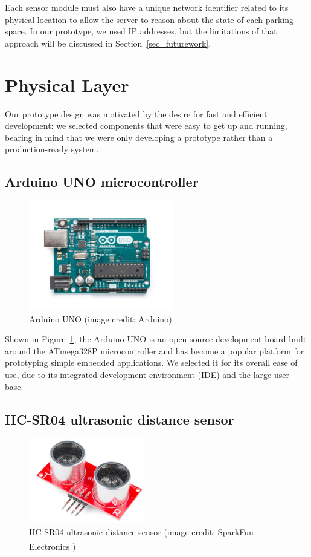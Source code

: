 \documentclass[conference]{IEEEtran}
\begin{document}
Each sensor module must also have a unique network identifier related to its physical location to allow the server to reason about the state of each parking space. In our prototype, we used IP addresses, but the limitations of that approach will be discussed in Section~\ref{sec_futurework}.

\section{Physical Layer}\label{sec_phys}
Our prototype design was motivated by the desire for fast and efficient development: we selected components that were easy to get up and running, bearing in mind that we were only developing a prototype rather than a production-ready system.

\subsection{Arduino UNO microcontroller}

\begin{figure}[h]
	\centering
	\includegraphics[width=2.5in]{arduinoUNO.jpg}
	\caption{Arduino UNO (image credit: Arduino)}
	\label{fig_arduinoUNO}
\end{figure}

Shown in Figure~\ref{fig_arduinoUNO}, the Arduino UNO is an open-source development board built around the ATmega328P microcontroller and has become a popular platform for prototyping simple embedded applications. We selected it for its overall ease of use, due to its integrated development environment (IDE) and the large user base.

\subsection{HC-SR04 ultrasonic distance sensor}

\begin{figure}[h]
	\centering
	\includegraphics[width=2.0in]{hcsr04.png}
	\caption{HC-SR04 ultrasonic distance sensor (image credit: SparkFun Electronics \textsuperscript{\textregistered})}
	\label{fig_hcsr04}
\end{figure}
\end{document}
